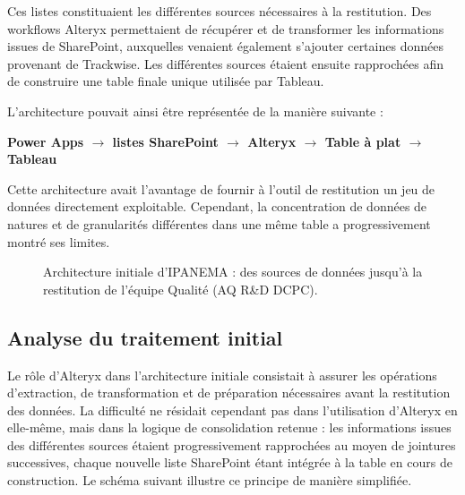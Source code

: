 Ces listes constituaient les différentes sources nécessaires à la restitution. Des workflows 
Alteryx permettaient de récupérer et de transformer les informations issues de SharePoint, 
auxquelles venaient également s’ajouter certaines données provenant de Trackwise. Les 
différentes sources étaient ensuite rapprochées afin de construire une table finale unique 
utilisée par Tableau.  

L’architecture pouvait ainsi être représentée de la manière suivante : 

\begin{center}
\begin{tcolorbox}[
    colframe=gray!60,       %
    colback=gray!4!white,   %
    boxrule=0.8pt,          %
    arc=5pt,                %
    width=\textwidth,       %
    halign=center,          %
    top=8pt, bottom=8pt
]
\small\bfseries
Power Apps 
\;\textcolor{gray!80}{$\longrightarrow$} listes SharePoint 
\;\textcolor{gray!80}{$\longrightarrow$}\; 
Alteryx 
\;\textcolor{gray!80}{$\longrightarrow$}\; 
Table à plat 
\;\textcolor{gray!80}{$\longrightarrow$}\; 
Tableau
\end{tcolorbox}
\end{center}

Cette architecture avait l’avantage de fournir à l’outil de restitution un jeu de données 
directement exploitable. Cependant, la concentration de données de natures et de 
granularités différentes dans une même table a progressivement montré ses limites. 

\begin{figure}[H]
    \centering
    \caption{Architecture initiale d'IPANEMA : des sources de données jusqu'à la restitution de l'équipe Qualité (AQ R\&D DCPC).}
    \label{Architecture_initiale_d'IPANEMA}
\end{figure}

\subsection{Analyse du traitement initial }
Le rôle d'Alteryx dans l'architecture initiale consistait à assurer les opérations d'extraction, 
de transformation et de préparation nécessaires avant la restitution des données. La difficulté 
ne résidait cependant pas dans l'utilisation d'Alteryx en elle-même, mais dans la logique de 
consolidation retenue : les informations issues des différentes sources étaient 
progressivement rapprochées au moyen de jointures successives, chaque nouvelle liste 
SharePoint étant intégrée à la table en cours de construction. Le schéma suivant illustre ce 
principe de manière simplifiée.  

